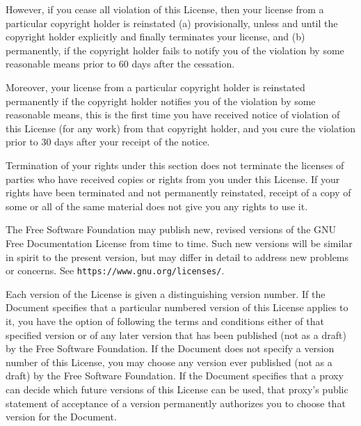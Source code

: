 However, if you cease all violation of this License, then your license
from a particular copyright holder is reinstated (a) provisionally,
unless and until the copyright holder explicitly and finally
terminates your license, and (b) permanently, if the copyright holder
fails to notify you of the violation by some reasonable means prior to
60 days after the cessation.

Moreover, your license from a particular copyright holder is
reinstated permanently if the copyright holder notifies you of the
violation by some reasonable means, this is the first time you have
received notice of violation of this License (for any work) from that
copyright holder, and you cure the violation prior to 30 days after
your receipt of the notice.

Termination of your rights under this section does not terminate the
licenses of parties who have received copies or rights from you under
this License.  If your rights have been terminated and not permanently
reinstated, receipt of a copy of some or all of the same material does
not give you any rights to use it.


\stopalignment


The Free Software Foundation may publish new, revised versions
of the GNU Free Documentation License from time to time.  Such new
versions will be similar in spirit to the present version, but may
differ in detail to address new problems or concerns.  See
{\tt https://www.gnu.org/licenses/}.

Each version of the License is given a distinguishing version number.
If the Document specifies that a particular numbered version of this
License  applies to it, you have the option of
following the terms and conditions either of that specified version or
of any later version that has been published (not as a draft) by the
Free Software Foundation.  If the Document does not specify a version
number of this License, you may choose any version ever published (not
as a draft) by the Free Software Foundation.  If the Document
specifies that a proxy can decide which future versions of this
License can be used, that proxy's public statement of acceptance of a
version permanently authorizes you to choose that version for the
Document.


\stopalignment


